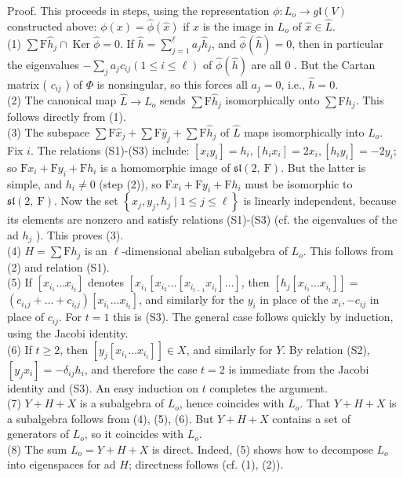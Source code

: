 \documentclass[10pt]{article}
\begin{document}
Proof. This proceeds in steps, using the representation $\phi: L_{o} \rightarrow g \mathfrak{l}(V)$ constructed above: $\phi(x)=\hat{\phi}(\hat{x})$ if $x$ is the image in $L_{o}$ of $\hat{x} \in \hat{L}$.\\
(1) $\sum \mathrm{F} \hat{h}_{j} \cap \operatorname{Ker} \hat{\phi}=0$. If $\hat{h}=\sum_{j=1}^{\ell} a_{j} \hat{h}_{j}$, and $\hat{\phi}(\hat{h})=0$, then in particular the eigenvalues $-\sum_{j} a_{j} c_{i j}(1 \leq i \leq \ell)$ of $\hat{\phi}(\hat{h})$ are all 0 . But the Cartan matrix ( $c_{i j}$ ) of $\Phi$ is nonsingular, so this forces all $a_{j}=0$, i.e., $\hat{h}=0$.\\
(2) The canonical map $\hat{L} \rightarrow L_{o}$ sends $\sum \mathrm{F} \hat{h}_{j}$ isomorphically onto $\sum \mathrm{F} h_{j}$. This follows directly from (1).\\
(3) The subspace $\sum \mathrm{F} \hat{x}_{j}+\sum \mathrm{F} \hat{y}_{j}+\sum \mathrm{F} \hat{h}_{j}$ of $\hat{L}$ maps isomorphically into $L_{o}$. Fix $i$. The relations (S1)-(S3) include: $\left[x_{i} y_{i}\right]=h_{i},\left[h_{i} x_{i}\right]=2 x_{i},\left[h_{i} y_{i}\right]=-2 y_{i}$; so $\mathrm{F} x_{i}+\mathrm{F} y_{i}+\mathrm{F} h_{i}$ is a homomorphic image of $\mathfrak{s l}(2, \mathrm{~F})$. But the latter is simple, and $h_{i} \neq 0$ (step (2)), so $\mathrm{F} x_{i}+\mathrm{F} y_{i}+\mathrm{F} h_{i}$ must be isomorphic to $\mathfrak{s l}(2, \mathrm{~F})$. Now the set $\left\{x_{j}, y_{j}, h_{j} \mid 1 \leq j \leq \ell\right\}$ is linearly independent, because its elements are nonzero and satisfy relations (S1)-(S3) (cf. the eigenvalues of the ad $h_{j}$ ). This proves (3).\\
(4) $H=\sum \mathrm{F} h_{j}$ is an $\ell$-dimensional abelian subalgebra of $L_{o}$. This follows from (2) and relation (S1).\\
(5) If $\left[x_{i_{1}} \ldots x_{i_{t}}\right]$ denotes $\left[x_{i_{1}}\left[x_{i_{2}} \ldots\left[x_{i_{t-1}} x_{i_{t}}\right] \ldots\right]\right.$, then $\left[h_{j}\left[x_{i_{1}} \ldots x_{i_{t}}\right]\right]=$ $\left(c_{i_{1} j}+\ldots+c_{i_{t} j}\right)\left[x_{i_{1}} \ldots x_{i_{t}}\right]$, and similarly for the $y_{i}$ in place of the $x_{i},-c_{i j}$ in place of $c_{i j}$. For $t=1$ this is (S3). The general case follows quickly by induction, using the Jacobi identity.\\
(6) If $t \geq 2$, then $\left[y_{j}\left[x_{i_{1}} \ldots x_{i_{t}}\right]\right] \in X$, and similarly for $Y$. By relation (S2), $\left[y_{j} x_{i}\right]=-\delta_{i j} h_{i}$, and therefore the case $t=2$ is immediate from the Jacobi identity and (S3). An easy induction on $t$ completes the argument.\\
(7) $Y+H+X$ is a subalgebra of $L_{o}$, hence coincides with $L_{o}$. That $Y+H+X$ is a subalgebra follows from (4), (5), (6). But $Y+H+X$ contains a set of generators of $L_{o}$, so it coincides with $L_{o}$.\\
(8) The sum $L_{o}=Y+H+X$ is direct. Indeed, (5) shows how to decompose $L_{o}$ into eigenspaces for ad $H$; directness follows (cf. (1), (2)).
\end{document}
